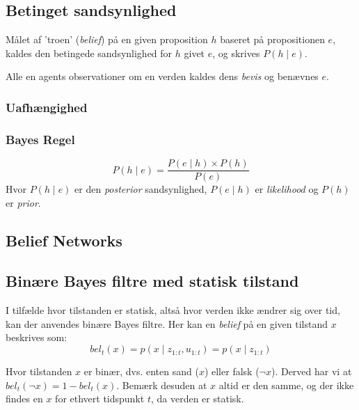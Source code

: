 \subsection{Betinget sandsynlighed}

Målet af 'troen' (\textit{belief}) på en given proposition $ h $ baseret på propositionen $ e $, kaldes den betingede sandsynlighed for $ h $ givet $ e $, og skrives $P(h \mid e)$.

Alle en agents observationer om en verden kaldes dens \emph{bevis} og benævnes $ e $.




\subsubsection{Uafhængighed}



\subsubsection{Bayes Regel}

$$P(h \mid e) = \frac{P(e \mid h) \times P(h)}{P(e)}$$
Hvor $P(h \mid e)$ er den \emph{posterior} sandsynlighed, $P(e \mid h)$ er \emph{likelihood} og $P(h)$ er \emph{prior}. 


\subsection{Belief Networks}







\subsection{Binære Bayes filtre med statisk tilstand}\label{bayes_binaerfiltre}
I tilfælde hvor tilstanden er statisk, altså hvor verden ikke ændrer sig over tid, kan der anvendes binære Bayes filtre.
Her kan en \textit{belief} på en given tilstand $x$ beskrives som:
\begin{equation}
bel_t(x) = p(x \mid z_{1:t},u_{1:t}) = p(x \mid z_{1:t})
\end{equation}

Hvor tilstanden $x$ er binær, dvs. enten sand ($x$) eller falsk ($\lnot x$).
Derved har vi at $bel_t(\lnot x) = 1 - bel_t(x)$.
Bemærk desuden at $x$ altid er den samme, og der ikke findes en $x$ for ethvert tidspunkt $t$, da verden er statisk.

